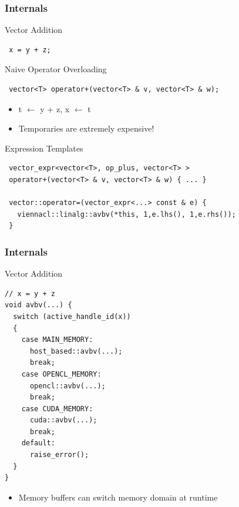 


\begin{frame}[fragile]
\frametitle{Internals}

 \begin{block}{Vector Addition}
  \begin{lstlisting}
 x = y + z;
  \end{lstlisting}
 \end{block}


 \begin{block}{Naive Operator Overloading}
  \begin{lstlisting}
 vector<T> operator+(vector<T> & v, vector<T> & w);
  \end{lstlisting}


  \begin{itemize}
   \item t $\leftarrow$ y + z, x $\leftarrow$ t
   \item Temporaries are extremely expensive! 
  \end{itemize}
 \end{block}


 \begin{block}{Expression Templates}
  \begin{lstlisting}
 vector_expr<vector<T>, op_plus, vector<T> >
 operator+(vector<T> & v, vector<T> & w) { ... }

 vector::operator=(vector_expr<...> const & e) {
   viennacl::linalg::avbv(*this, 1,e.lhs(), 1,e.rhs());
 }
  \end{lstlisting}
  \vspace*{0.5cm}

 \end{block}

\end{frame}



\begin{frame}[fragile]
\frametitle{Internals}

 \begin{block}{Vector Addition}
  \begin{lstlisting}
// x = y + z
void avbv(...) {
  switch (active_handle_id(x))
  {
    case MAIN_MEMORY:
      host_based::avbv(...);
      break;
    case OPENCL_MEMORY:
      opencl::avbv(...);
      break;
    case CUDA_MEMORY:
      cuda::avbv(...);
      break;
    default: 
      raise_error();
  }
}
\end{lstlisting}
  \begin{itemize}
   \item Memory buffers can switch memory domain at runtime
  \end{itemize}

 \end{block}

\end{frame}

